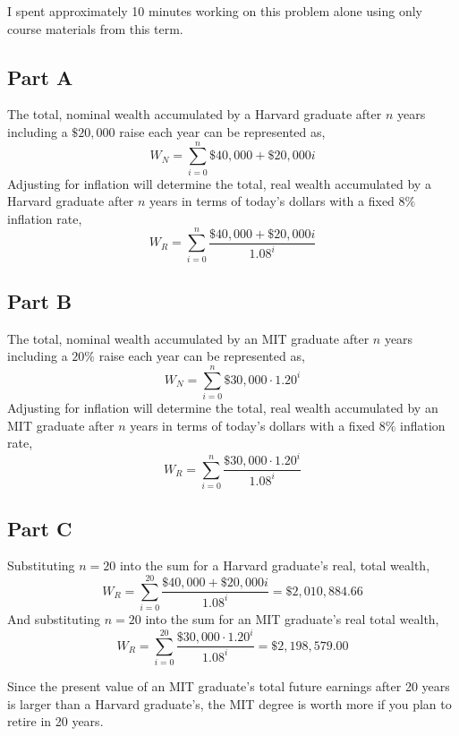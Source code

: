 \documentclass{article}
\begin{document}
I spent approximately 10 minutes working on this problem alone using only course
materials from this term.

\subsection*{Part A}

The total, nominal wealth accumulated by a Harvard graduate after $n$ years
including a $\$20,000$ raise each year can be represented as,
$$ W_N = \sum\limits_{i = 0}^n \$40,000 + \$20,000 i $$
Adjusting for inflation will determine the total, real wealth accumulated by a
Harvard graduate after $n$ years in terms of today's dollars with a fixed $8\%$
inflation rate,
$$ W_R = \sum\limits_{i = 0}^n \frac{\$40,000 + \$20,000 i}{1.08^i} $$

\break

\subsection*{Part B}

The total, nominal wealth accumulated by an MIT graduate after $n$ years
including a $20\%$ raise each year can be represented as,
$$ W_N = \sum\limits_{i = 0}^n \$30,000 \cdot 1.20^i $$
Adjusting for inflation will determine the total, real wealth accumulated by an
MIT graduate after $n$ years in terms of today's dollars with a fixed $8\%$
inflation rate,
$$ W_R = \sum\limits_{i = 0}^n \frac{\$30,000 \cdot 1.20^i}{1.08^i} $$

\break

\subsection*{Part C}

Substituting $n = 20$ into the sum for a Harvard graduate's real, total wealth,
$$ W_R = \sum\limits_{i = 0}^{20} \frac{\$40,000 + \$20,000 i}{1.08^i} =
\$2,010,884.66 $$
And substituting $n = 20$ into the sum for an MIT graduate's real total wealth,
$$ W_R = \sum\limits_{i = 0}^{20} \frac{\$30,000 \cdot 1.20^i}{1.08^i} =
\$2,198,579.00 $$

Since the present value of an MIT graduate's total future earnings after 20
years is larger than a Harvard graduate's, the MIT degree is worth more if you
plan to retire in 20 years.
\end{document}
